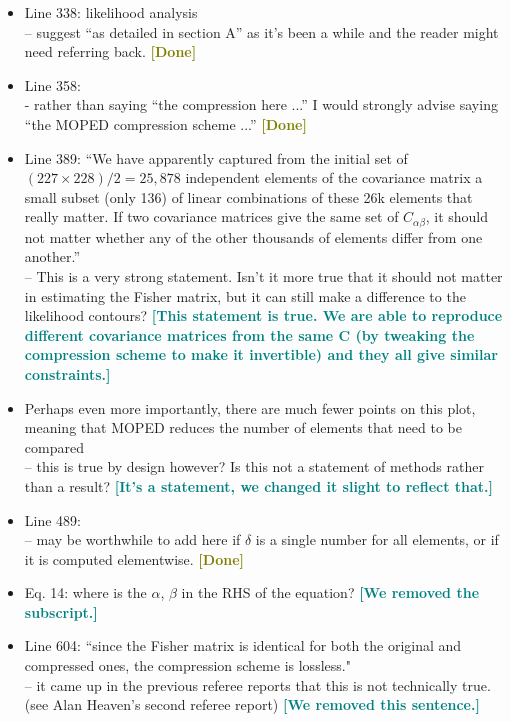 \documentclass{article}
\newcommand\reply[1]{{\bf {\textcolor{teal}{[#1]}}}}
\newcommand\done{{\bf {\textcolor{olive}{[Done]}}}}
\begin{document}
\begin{itemize}
		\item Line 338: likelihood analysis \\ 
		– suggest “as detailed in section A” as it’s been a while and the reader might need referring back. \done
		
		\item Line 358:\\
		- rather than saying “the compression here ...” I would strongly advise saying “the MOPED compression scheme ...” \done
		
		\item Line 389:
		“We have apparently captured from the initial set of $(227 \times 228)/2 = 25, 878$ independent elements of the covariance matrix a small subset (only 136) of linear combinations of these 26k elements that really matter. If two covariance matrices give the same set of $C_{\alpha \beta}$, it should not matter whether any of the other thousands of elements differ from one another.” \\ 
		– This is a very strong statement. Isn’t it more true that it should not matter in estimating the Fisher matrix, but it can still make a difference to the likelihood contours? \reply{This statement is true. We are able to reproduce different covariance matrices from the same C (by tweaking the compression scheme to make it invertible) and they all give similar constraints.}
		
		\item Perhaps even more importantly, there are much fewer points on this plot, meaning that MOPED reduces the number of elements that need to be compared \\ 
		– this is true by design however? Is this not a statement of methods rather than a result? \reply{It's a statement, we changed it slight to reflect that.}
		
		\item Line 489: \\ 
		– may be worthwhile to add here if $\delta$ is a single number for all elements, or if it is computed elementwise. \done
		
		\item Eq. 14:
		where is the $\alpha$, $\beta$ in the RHS of the equation? \reply{We removed the subscript.}
		
		\item Line 604:
		“since the Fisher matrix is identical for both the original and compressed ones, the compression scheme is lossless." \\
		– it came up in the previous referee reports that this is not technically true. (see Alan Heaven’s second referee report) \reply{We removed this sentence.}
	\end{itemize}
	
\end{document}
